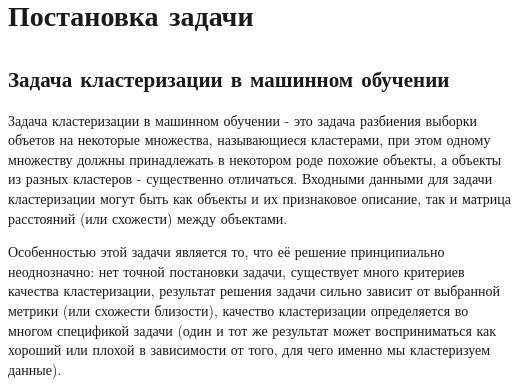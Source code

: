 \documentclass[12pt,fleqn]{article}
\begin{document}
\section{Постановка задачи}\label{problem}

\subsection{Задача кластеризации в машинном обучении}

Задача кластеризации в машинном обучении - это задача разбиения выборки объетов на некоторые множества, называющиеся кластерами, при этом одному множеству должны принадлежать в некотором роде похожие объекты, а объекты из разных кластеров - существенно отличаться. Входными данными для задачи кластеризации могут быть как объекты и их признаковое описание, так и матрица расстояний (или схожести) между объектами. 

Особенностью этой задачи является то, что её решение принципиально неоднозначно: нет точной постановки задачи, существует много критериев качества кластеризации, результат решения задачи сильно зависит от выбранной метрики (или схожести близости), качество кластеризации определяется во многом спецификой задачи (один и тот же результат может восприниматься как хороший или плохой в зависимости от того, для чего именно мы кластеризуем данные).
\end{document}
